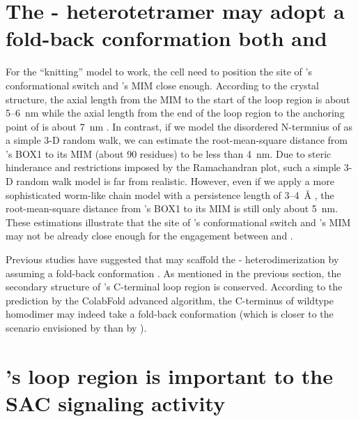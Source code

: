 \section{The - heterotetramer may adopt a fold-back conformation both  and }

For the ``knitting'' model to work, the cell need to position the site of 's conformational switch and 's MIM close enough. According to the crystal structure, the axial length from the MIM to the start of the loop region is about 5--\SI{6}{nm} while the axial length from the end of the loop region to the anchoring point of  is about \SI{7}{nm} \cite{TemplateModel, Ji2017eLife, BUB1-CDC20-MAD1, Structure1GO4, Structure4DZO}. In contrast, if we model the disordered N-termnius of  as a simple 3-D random walk, we can estimate the root-mean-square distance from 's BOX1 to its MIM (about 90 residues) to be less than \SI{4}{nm}. Due to steric hinderance and restrictions imposed by the Ramachandran plot, such a simple 3-D random walk model is far from realistic. However, even if we apply a more sophisticated worm-like chain model with a persistence length of 3--\SI{4}{\angstrom} \cite{RandomWalk3D-WormLikeChain}, the root-mean-square distance from 's BOX1 to its MIM is still only about \SI{5}{nm}. These estimations illustrate that the site of 's conformational switch and 's MIM may not be already close enough for the engagement between  and .

Previous studies have suggested that  may scaffold the - heterodimerization by assuming a fold-back conformation \cite{Structure1GO4, SpMad1}. As mentioned in the previous section, the secondary structure of 's C-terminal loop region is conserved. According to the prediction by the ColabFold advanced algorithm, the C-terminus of wildtype  homodimer may indeed take a fold-back conformation (which is closer to the scenario envisioned by \cite{SpMad1} than by \cite{Structure1GO4}). %




\section{'s loop region is important to the SAC signaling activity }
\label{LoopDeletionSection}

